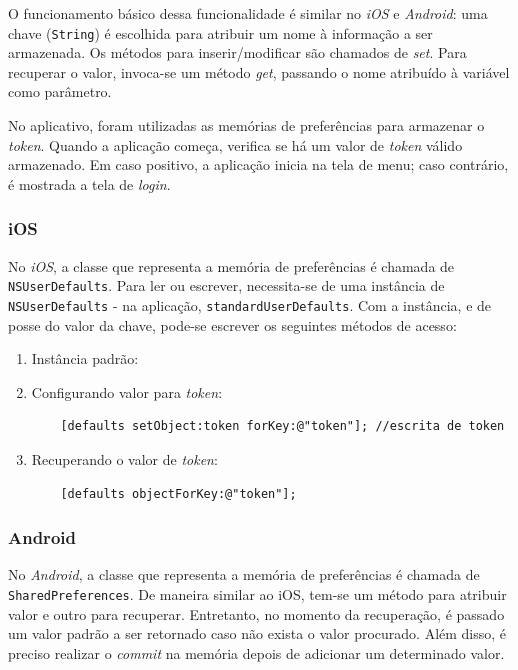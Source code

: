 			O funcionamento básico dessa funcionalidade é similar no \emph{iOS} e \emph{Android}: uma chave (\texttt{String}) é escolhida para atribuir um nome à informação a ser armazenada. Os métodos para inserir/modificar são chamados de \emph{set}.  Para recuperar o valor, invoca-se um método \emph{get}, passando o nome atribuído à variável como parâmetro.
            
			No aplicativo, foram utilizadas as memórias de preferências para armazenar o \emph{token}. Quando a aplicação começa, verifica se há um valor de \emph{token} válido armazenado. Em caso positivo, a aplicação inicia na tela de menu; caso contrário, é mostrada a tela de \emph{login}.
     
    \subsubsection{iOS}
            
			No \emph{iOS}, a classe que representa a memória de preferências é chamada de \texttt{NSUserDefaults}. Para ler ou escrever, necessita-se de uma instância de \texttt{NSUserDefaults} - na aplicação, \texttt{standardUserDefaults}. Com a instância, e de posse do valor da chave, pode-se escrever os seguintes métodos de acesso:
\begin{enumerate}     
\item Instância padrão:
     
\item Configurando valor para \emph{token}:
\begin{lstlisting}   
    [defaults setObject:token forKey:@"token"]; //escrita de token
  \end{lstlisting}    
\item Recuperando o valor de \emph{token}:
\begin{lstlisting}   
    [defaults objectForKey:@"token"];
\end{lstlisting} 
\end{enumerate}     
    \subsubsection{Android}
     
    No \emph{Android}, a classe que representa a memória de preferências é chamada de \texttt{SharedPreferences}. De maneira similar ao iOS, tem-se um método para atribuir valor e outro para recuperar. Entretanto, no momento da recuperação, é passado um valor padrão a ser retornado caso não exista o valor procurado.  Além disso, é preciso realizar o \emph{commit} na memória depois de adicionar um determinado valor.
    

